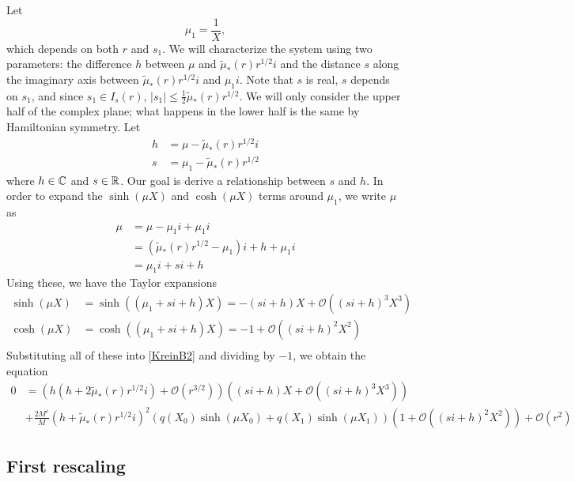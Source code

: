 \documentclass[thesis.tex]{subfiles}
\begin{document}
Let 
\[
\mu_1 = \frac{1}{X},
\]
which depends on both $r$ and $s_1$. We will characterize the system using two parameters: the difference $h$ between $\mu$ and $\tilde{\mu}_*(r) r^{1/2} i$ and the distance $s$ along the imaginary axis between $\tilde{\mu}_*(r) r^{1/2} i$ and $\mu_1 i$. Note that $s$ is real, $s$ depends on $s_1$, and since $s_1 \in I_s(r)$, $|s_1| \leq \frac{1}{2} \tilde{\mu}_*(r) r^{1/2}$. We will only consider the upper half of the complex plane; what happens in the lower half is the same by Hamiltonian symmetry. Let 
\begin{align*}
h &= \mu - \tilde{\mu}_*(r) r^{1/2} i \\
s &= \mu_1 - \tilde{\mu}_*(r) r^{1/2}
\end{align*}
where $h \in \mathbb{C}$ and $s \in \mathbb{R}$. Our goal is derive a relationship between $s$ and $h$. In order to expand the $\sinh(\mu X)$ and $\cosh(\mu X)$ terms around $\mu_1$, we write $\mu$ as
\begin{align*}
\mu &= \mu - \mu_1 i + \mu_1 i \\
&= (\tilde{\mu}_*(r) r^{1/2} - \mu_1)i + h + \mu_1 i \\
&= \mu_1 i + s i + h
\end{align*}
Using these, we have the Taylor expansions
\begin{align*}
\sinh(\mu X) &= \sinh((\mu_1 + s i + h)X)
= -(s i + h)X + \mathcal{O}\left( (s i +h)^3 X^3 \right) \\
\cosh(\mu X) &= \cosh((\mu_1 + s i + h)X)
= -1 + \mathcal{O}\left( (s i + h)^2 X^2 \right) \\
\end{align*}
Substituting all of these into \cref{KreinB2} and dividing by $-1$, we obtain the equation
\begin{equation}\label{KreinB3}
\begin{aligned}
0 &= \left( h ( h + 2 \tilde{\mu}_*(r) r^{1/2} i) +  \mathcal{O}( r^{3/2} )\right) \left( (s i + h)X + \mathcal{O}\left( (si+h)^3 X^3 \right)  \right) \\
&+\frac{2 M^c}{M} ( h + \tilde{\mu}_*(r) r^{1/2} i)^2 ( q(X_0)\sinh(\mu X_0) + q(X_1) \sinh(\mu X_1) ) \left( 1 + \mathcal{O}\left( (s i +h)^2 X^2 \right) \right) + \mathcal{O}( r^2 ) 
\end{aligned}
\end{equation}

\subsection{First rescaling}
\end{document}
